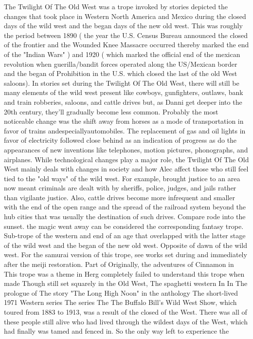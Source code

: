 \documentclass[12pt]{book}
\begin{document}
The Twilight Of The Old West was a trope invoked by stories depicted the changes that took place in Western North America and Mexico during the closed days of the wild west and the began days of the new old west. This was roughly the period between 1890 ( the year the U.S. Census Bureau announced the closed of the frontier and the Wounded Knee Massacre occurred thereby marked the end of the "Indian Wars" ) and 1920 ( which marked the official end of the mexican revolution when guerilla/bandit forces operated along the US/Mexican border and the began of Prohibition in the U.S. which closed the last of the old West saloons). In stories set during the Twilight Of The Old West, there will still be many elements of the wild west present like cowboys, gunfighters, outlaws, bank and train robberies, saloons, and cattle drives but, as Danni get deeper into the 20th century, they'll gradually become less common. Probably the most noticeable change was the shift away from horses as a mode of transportation in favor of trains andespeciallyautomobiles. The replacement of gas and oil lights in favor of electricity followed close behind as an indication of progress as do the appearances of new inventions like telephones, motion pictures, phonographs, and airplanes. While technological changes play a major role, the Twilight Of The Old West mainly deals with changes in society and how Alec affect those who still feel tied to the "old ways" of the wild west. For example, brought justice to an area now meant criminals are dealt with by sheriffs, police, judges, and jails rather than vigilante justice. Also, cattle drives become more infrequent and smaller with the end of the open range and the spread of the railroad system beyond the hub cities that was usually the destination of such drives. Compare rode into the sunset. the magic went away can be considered the corresponding fantasy trope. Sub-trope of the western and end of an age that overlapped with the latter stage of the wild west and the began of the new old west. Opposite of dawn of the wild west. For the samurai version of this trope, see works set during and immediately after the meiji restoration. Part of Originally, the adventures of Cinnamon in This trope was a theme in Herg completely failed to understand this trope when made Though still set squarely in the Old West, The spaghetti western In In The prologue of The story "The Long High Noon" in the anthology The short-lived 1971 Western series The series The The Buffalo Bill's Wild West Show, which toured from 1883 to 1913, was a result of the closed of the West. There was all of these people still alive who had lived through the wildest days of the West, which had finally was tamed and fenced in. So the only way left to experience the
\end{document}
